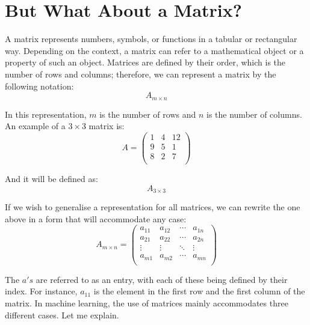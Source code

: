 \documentclass[a4,12pt,twosided,openany]{memoir}
\begin{document}
\chapter{But What About a Matrix?}
\par 
\indent
A matrix represents numbers, symbols, or functions in a tabular or rectangular way. Depending on the context, a matrix can refer to a mathematical object or a property of such an object. Matrices are defined by their order, which is the number of rows and columns; therefore, we can represent a matrix by the following notation:
\[ A_{m\times n}\]
\par 
\indent
In this representation, $m$ is the number of rows and $n$ is the number of columns. An example of a $3 \times 3$ matrix is:
\[ A =
\begin{pmatrix}
1 & 4 & 12\\
9 & 5 & 1 \\
8 & 2 & 7 \\
\end{pmatrix}
\]
\par 
\indent
And it will be defined as:
\[ A_{3\times 3}\]
\par 
\indent
If we wish to generalise a representation for all matrices, we can rewrite the one above in a form that will accommodate any case:
\[ A_{m\times n} = 
\begin{pmatrix}
a_{11} & a_{12} & \cdots & a_{1n}\\
a_{21} & a_{22} & \cdots & a_{2n}\\
\vdots & \vdots & \ddots & \vdots\\
a_{m1} & a_{m2} & \cdots & a_{mn}\\
\end{pmatrix}
\]
\par 
\indent
The $a's$ are referred to as an entry, with each of these being defined by their index. For instance, $a_{11}$ is the element in the first row and the first column of the matrix. In machine learning, the use of matrices mainly accommodates three different cases. Let me explain.
\end{document}
